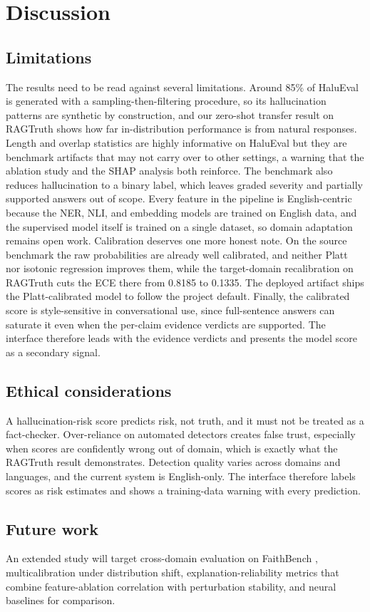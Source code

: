 \section{Discussion}

\subsection{Limitations}

The results need to be read against several limitations. Around 85\% of HaluEval is generated with a sampling-then-filtering procedure, so its hallucination patterns are synthetic by construction, and our zero-shot transfer result on RAGTruth shows how far in-distribution performance is from natural responses. Length and overlap statistics are highly informative on HaluEval but they are benchmark artifacts that may not carry over to other settings, a warning that the ablation study and the SHAP analysis both reinforce. The benchmark also reduces hallucination to a binary label, which leaves graded severity and partially supported answers out of scope. Every feature in the pipeline is English-centric because the NER, NLI, and embedding models are trained on English data, and the supervised model itself is trained on a single dataset, so domain adaptation remains open work. Calibration deserves one more honest note. On the source benchmark the raw probabilities are already well calibrated, and neither Platt nor isotonic regression improves them, while the target-domain recalibration on RAGTruth cuts the ECE there from 0.8185 to 0.1335. The deployed artifact ships the Platt-calibrated model to follow the project default. Finally, the calibrated score is style-sensitive in conversational use, since full-sentence answers can saturate it even when the per-claim evidence verdicts are supported. The interface therefore leads with the evidence verdicts and presents the model score as a secondary signal.

\subsection{Ethical considerations}

A hallucination-risk score predicts risk, not truth, and it must not be treated as a fact-checker. Over-reliance on automated detectors creates false trust, especially when scores are confidently wrong out of domain, which is exactly what the RAGTruth result demonstrates. Detection quality varies across domains and languages, and the current system is English-only. The interface therefore labels scores as risk estimates and shows a training-data warning with every prediction.

\subsection{Future work}

An extended study will target cross-domain evaluation on FaithBench \cite{faithbench}, multicalibration under distribution shift, explanation-reliability metrics that combine feature-ablation correlation with perturbation stability, and neural baselines for comparison.
